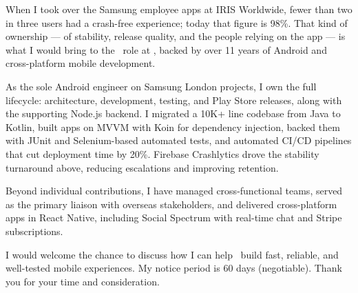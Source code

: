 \begin{cvletter}

When I took over the Samsung employee apps at IRIS Worldwide, fewer than two in three users had a crash-free experience; today that figure is 98\%. That kind of ownership --- of stability, release quality, and the people relying on the app --- is what I would bring to the \PositionTitle\ role at \CompanyName, backed by over 11 years of Android and cross-platform mobile development.

As the sole Android engineer on Samsung London projects, I own the full lifecycle: architecture, development, testing, and Play Store releases, along with the supporting Node.js backend. I migrated a 10K+ line codebase from Java to Kotlin, built apps on MVVM with Koin for dependency injection, backed them with JUnit and Selenium-based automated tests, and automated CI/CD pipelines that cut deployment time by 20\%. Firebase Crashlytics drove the stability turnaround above, reducing escalations and improving retention.

Beyond individual contributions, I have managed cross-functional teams, served as the primary liaison with overseas stakeholders, and delivered cross-platform apps in React Native, including Social Spectrum with real-time chat and Stripe subscriptions.

I would welcome the chance to discuss how I can help \CompanyName\ build fast, reliable, and well-tested mobile experiences. My notice period is 60 days (negotiable). Thank you for your time and consideration.

\end{cvletter}
